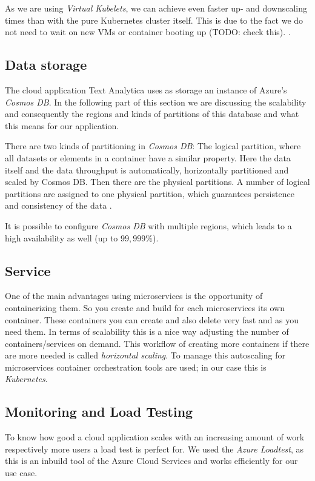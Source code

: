 \documentclass[conference]{IEEEtran}
\begin{document}
As we are using \textit{Virtual Kubelets}, we can achieve even faster up- and downscaling times
than with the pure Kubernetes cluster itself. This is due to the fact we do not need to wait on new VMs or container booting up (TODO: check this).
\cite{MicrosoftVirtualNode}.

\subsection{Data storage}
The cloud application Text Analytica uses as storage an instance of Azure's \textit{Cosmos DB}. In the following part of this section we are discussing the scalability and consequently the regions and kinds of partitions of this database and what this means for our application.

There are two kinds of partitioning in \textit{Cosmos DB}: The logical partition, where all datasets or elements in a container have a similar property. Here the data itself and the data throughput is automatically, horizontally partitioned and scaled by Cosmos DB. Then there are the physical partitions. A number of logical partitions are assigned to one physical partition, which guarantees persistence and consistency of the data \cite{CosmosDBHorScal}.

It is possible to configure \textit{Cosmos DB} with multiple regions, which leads to a high availability as well (up to $99,999\%$)\cite{CosmosDBHA}.

\subsection{Service}
One of the main advantages using microservices is the opportunity of containerizing them. So you create and build for each microservices its own container. These containers you can create and also delete very fast and as you need them.
In terms of scalability this is a nice way adjusting the number of containers/services on demand.
This workflow of creating more containers if there are more needed is called \textit{horizontal scaling}. To manage this autoscaling for microservices container orchestration tools are used; in our case this is \textit{Kubernetes}.
\cite{GuideContainerClusters}
\cite{KubernetesScaling}
\cite{KubernetesAutoscaler}

\subsection{Monitoring and Load Testing}
To know how good a cloud application scales with an increasing amount of work respectively more users a load test is perfect for. We used the \textit{Azure Loadtest}, as this is an inbuild tool of the Azure Cloud Services and works efficiently for our use case.
\end{document}
